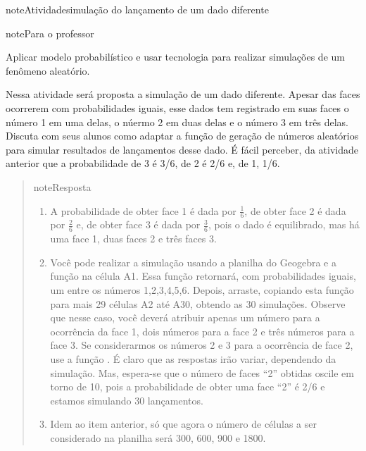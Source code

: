 \begin{sphinxadmonition}{note}{Atividade}{simulação do lançamento de um dado diferente}
\label{ativ-simulacao-dado-especial}

\begin{sphinxadmonition}{note}{Para o professor}

 Aplicar modelo probabilístico e usar tecnologia para realizar simulações de um fenômeno aleatório.

 Nessa atividade será proposta a simulação de um dado diferente. Apesar das faces ocorrerem com probabilidades iguais, esse dados tem registrado em suas faces o número 1 em uma delas, o núermo 2 em duas delas e o número 3 em três delas. Discuta com seus alunos como adaptar a função de geração de números aleatórios para simular resultados de lançamentos desse dado. É fácil perceber, da atividade anterior que a probabilidade de 3 é 3/6, de 2 é 2/6 e, de 1, 1/6.
\begin{quote}

\begin{sphinxadmonition}{note}{Resposta}

\begin{enumerate}
\item {} 
A probabilidade de obter face 1 é dada por \(\frac{1}{6}\), de obter face 2 é dada por \(\frac{2}{6}\) e, de obter face 3 é dada por \(\frac{3}{6}\), pois o dado é equilibrado, mas há uma face 1, duas faces 2 e três faces 3.

\item {} 
Você pode realizar a simulação usando a planilha do Geogebra e a função  na célula A1. Essa função retornará, com probabilidades iguais, um entre os números 1,2,3,4,5,6. Depois, arraste, copiando esta função para mais 29 células A2 até A30, obtendo as 30 simulações. Observe que nesse caso, você deverá atribuir apenas um número para a ocorrência da face 1, dois números para a face 2 e  três números para a face 3. Se considerarmos os números 2 e 3 para a ocorrência de face 2, use a função . É claro que as respostas irão variar, dependendo da simulação. Mas, espera-se que o número de faces “2” obtidas oscile em torno de 10, pois a probabilidade de obter uma face “2” é 2/6 e estamos simulando 30 lançamentos.

\item {} 
Idem ao item anterior, só que agora o número de células a ser considerado na planilha será 300, 600, 900 e 1800.


\end{enumerate}
\end{sphinxadmonition}
\end{quote}
\end{sphinxadmonition}
\end{sphinxadmonition}
